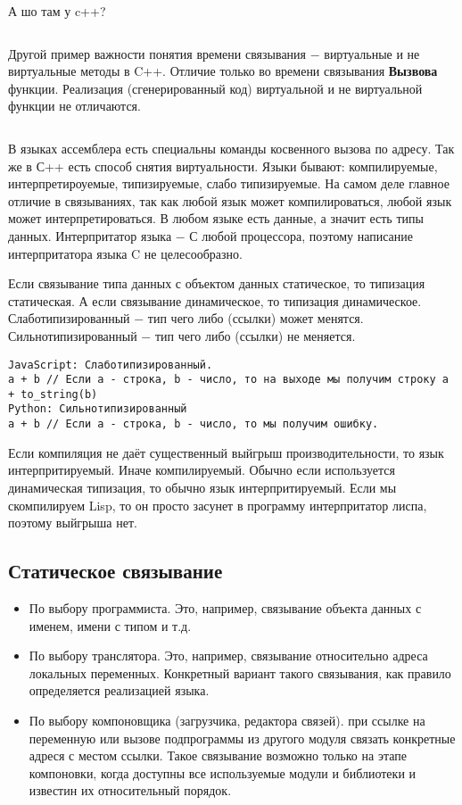 \documentclass[a4paper, 12pt, titlepage, finall]{extreport}
\begin{document}
            А шо там у c++?
\begin{lstlisting}
\end{lstlisting}
            Другой пример важности понятия времени связывания $-$ виртуальные и не виртуальные методы в C++.
            Отличие только во времени связывания \textbf{Вызвова} функции.
            Реализация (сгенерированный код) виртуальной и не виртуальной функции не отличаются. 
\begin{lstlisting}
\end{lstlisting}
            В языках ассемблера есть специальны команды косвенного вызова по адресу.
            Так же в С++ есть способ снятия виртуальности.
            Языки бывают: компилируемые, интерпретироуемые, типизируемые, слабо типизируемые.
            На самом деле главное отличие в связываниях, так как любой язык может компилироваться, любой язык может интерпретироваться.
            В любом языке есть данные, а значит есть типы данных. Интерпритатор языка $-$ С любой процессора, поэтому написание интерпритатора
            языка C не целесообразно.

            Если связывание типа данных с объектом данных статическое, то типизация статическая.
            А если связывание динамическое, то типизация динамическое.
            Слаботипизированный $-$ тип чего либо (ссылки) может менятся.
            Сильнотипизированный $-$ тип чего либо (ссылки) не меняется.
\begin{lstlisting}
JavaScript: Слаботипизированный.
a + b // Если a - строка, b - число, то на выходе мы получим строку a + to_string(b)
Python: Сильнотипизированный
a + b // Если a - строка, b - число, то мы получим ошибку.
\end{lstlisting}
            Если компиляция не даёт существенный выйгрыш производительности, то язык интерпритируемый. Иначе компилируемый.
            Обычно если используется динамическая типизация, то обычно язык интерпритируемый. Если мы скомпилируем Lisp, то 
            он просто засунет в программу интерпритатор лиспа, поэтому выйгрыша нет.
            \subsection{Статическое связывание}
                \begin{itemize}
                    \item По выбору программиста. Это, например, связывание объекта данных с именем, имени с типом и т.д.
                    \item По выбору транслятора. Это, например, связывание относительно адреса локальных переменных.
                        Конкретный вариант такого связывания, как правило определяется реализацией языка.
                    \item По выбору компоновщика (загрузчика, редактора связей). при ссылке на переменную 
                        или вызове подпрограммы из другого модуля связать конкретные адреся с местом ссылки. 
                        Такое связывание возможно только на этапе компоновки, когда доступны все используемые модули и библиотеки
                        и известин их относительный порядок.
                \end{itemize}
\end{document}
